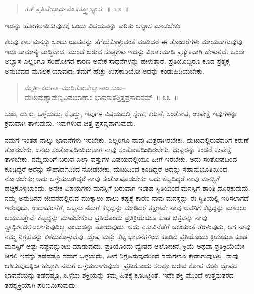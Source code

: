 \vspace{-0.3cm}

\begin{verse}
ತತ್​ ಪ್ರತಿಷೇಧಾರ್ಥಮೇಕತತ್ತ್ವಾಭ್ಯಾಸಃ~॥ ೩೨~॥
\end{verse}

\vspace{-0.3cm}

ಇದನ್ನು ಹೋಗಲಾಡಿಸುವುದಕ್ಕೆ ಒಂದು ವಿಷಯವನ್ನು ಕುರಿತು ಅಭ್ಯಾಸ ಮಾಡಬೇಕು. 

ಕೆಲವು ಕಾಲ ಮನಸ್ಸು ಒಂದು ರೂಪವನ್ನು ತೆಗೆದುಕೊಳ್ಳುವಂತೆ ಮಾಡಿದರೆ ಈ ತೊಂದರೆಗಳು ಮಾಯವಾಗುವುವು. ಇದು ಸಾಮಾನ್ಯ ಬುದ್ಧಿವಾದ. ಮುಂದೆ ಬರುವ ಸೂತ್ರಗಳು ಇದನ್ನು ವಿಶಾಲಮಾಡಿ ಪ್ರತ್ಯೇಕವಾಗಿ ಹೇಳುತ್ತವೆ. ಒಂದೇ ಅಭ್ಯಾಸ ಎಲ್ಲರಿಗೂ ಸರಿಹೋಗದ ಕಾರಣ ಅನೇಕ ಸಾಧನೆಗಳನ್ನು ಹೇಳುತ್ತಾರೆ. ಪ್ರತಿಯೊಬ್ಬರೂ ಕೂಡ ಪ್ರತ್ಯಕ್ಷ ಅನುಭವದ ಮೂಲಕ ಯಾವುದು ತಮಗೆ ಹೆಚ್ಚು ಉಪಕಾರಿಯೋ ಅದನ್ನು ಕಂಡುಹಿಡಿಯಬೇಕು. 

\vspace{-0.3cm}

\begin{verse}
ಮೈತ್ರೀ–ಕರುಣಾ–ಮುದಿತೋಪೇಕ್ಷಾಣಾಂ ಸುಖ–\\ದುಃಖಪುಣ್ಯಾಪುಣ್ಯವಿಷಯಾಣಾಂ ಭಾವನಾತಶ್ತಿತ್ತಪ್ರಸಾದನಮ್​~॥ ೩೩~॥
\end{verse}

\vspace{-0.3cm}

ಸುಖ, ದುಃಖ, ಒಳ್ಳೆಯದು, ಕೆಟ್ಟದ್ದು, ಇವುಗಳ ವಿಷಯದಲ್ಲಿ ಸ್ನೇಹ, ಕರುಣೆ, ಸಂತೋಷ, ಉಪೇಕ್ಷೆ ಇವುಗಳನ್ನು ಕ್ರಮವಾಗಿ ತಾಳುವುದು. ಇವುಗಳಿಂದ ಚಿತ್ತ ಪ್ರಸನ್ನ\break ವಾಗುವುದು. 

ನಮಗೆ ಇಂತಹ ನಾಲ್ಕು ಭಾವನೆಗಳು ಇರಬೇಕು. ಎಲ್ಲರಿಗೂ ನಾವು ಮಿತ್ರರಾಗಿರಬೇಕು. ದುಃಖದಲ್ಲಿರುವವರಿಗೆ ಕರುಣೆ ತೋರಬೇಕು. ಜನರು ಸಂತೋಷದಿಂದಿರುವಾಗ ನಾವು ಸಂತೋಷದಿಂದಿರಬೇಕು. ದುಷ್ಟರನ್ನು ಕಂಡರೆ ಉಪೇಕ್ಷೆ ತಾಳಬೇಕು. ನಮ್ಮೆದುರಿಗೆ ಬರುವ ಎಲ್ಲಾ ವಸ್ತುಗಳ ವಿಷಯದಲ್ಲಿಯೂ ಹೀಗೆ ಇರಬೇಕು. ಅದು ಸಂತೋಷದಿಂದ ಕೂಡಿದ್ದರೆ ಅದನ್ನು ಸೌಹಾರ್ದದಿಂದ ನೋಡಬೇಕು; ದುಃಖದಿಂದ ಕೂಡಿದ್ದರೆ ಅದನ್ನು ಸಹಾನುಭೂತಿಯಿಂದ ನೋಡಬೇಕು; ಅದು ಒಳ್ಳೆಯದಾಗಿದ್ದರೆ ನಾವು ಸಂತೋಷಪಡಬೇಕು; ಅದು ಕೆಟ್ಟದಿದ್ದರೆ ನಾವು ಮನಸ್ಸಿಗೆ ಹಚ್ಚಿಕೊಳ್ಳಬಾರದು. ಅನೇಕ ವಿಷಯಗಳು ಮನಸ್ಸಿಗೆ ಬರುವಾಗ ಇಂತಹ ಸ್ಥಿತಿಯಿಂದ ಮನಸ್ಸಿಗೆ ಶಾಂತಿ ದೊರಕುವುದು. ನಮ್ಮ ಅನುದಿನದ ಜೀವನದಲ್ಲಿರುವ ಮುಕ್ಕಾಲು ಪಾಲು ಕಷ್ಟಕ್ಕೆ ಕಾರಣ ನಾವು ಮನಸ್ಸನ್ನು ಈ ಸ್ಥಿತಿಯಲ್ಲಿ ಇರಿಸಲಾಗದೆ ಇರುವುದು. ಉದಾಹರಣೆಗೆ, ಒಬ್ಬನು ನಮಗೆ ಕೆಟ್ಟದ್ದನ್ನು ಮಾಡಿದರೆ ತಕ್ಷಣವೇ ನಾವು ಅವನಿಗೆ ಕೆಟ್ಟದ್ದನ್ನು ಮಾಡಲು ಬಯಸುತ್ತೇವೆ. ಕೆಟ್ಟದ್ದನ್ನು ಮಾಡಬೇಕೆಂಬ ಪ್ರತಿಯೊಂದು ಪ್ರತಿಕ್ರಿಯೆಯೂ ಕೂಡ ಚಿತ್ತವನ್ನು ನಾವು ಸ್ವಾಧೀನದಲ್ಲಿಡಲಾಗುವುದಿಲ್ಲ ಎಂಬುದನ್ನು ತೋರುವುದು. ಅದು ವಸ್ತುವಿನೆಡೆಗೆ ಅಲೆಯಂತೆ ತೆರಳುವುದು, ಆಗ ನಾವು ನಮ್ಮ ನಿಗ್ರಹವನ್ನು ಕಳೆದುಕೊಳ್ಳುವೆವು. ದ್ವೇಷ ಮತ್ತು ಕೆಟ್ಟ ಭಾವನೆಗಳಿಂದ ಕೂಡಿದ ಪ್ರತಿಯೊಂದು ಕ್ರಿಯೆಯೂ ಕೂಡ ಮನಸ್ಸಿಗೆ ಅಷ್ಟು ನಷ್ಟವನ್ನುಂಟು ಮಾಡುವುದು. ಪ್ರತಿಯೊಂದು ದ್ವೇಷದ ಆಲೋಚನೆ, ಕ್ರಿಯೆ ಅಥವಾ ಪ್ರತಿಕ್ರಿಯೆಯೇ ಆಗಲಿ ಇವನ್ನು ತಡೆದಷ್ಟೂ ನಮಗೆ ಒಳ್ಳೆಯದು. ಹೀಗೆ ನಿಗ್ರಹಿಸುವುದರಿಂದ ನಮಗೇನೂ ಕೇಡಾಗುವುದಿಲ್ಲ. ನಾವು ಆಶಿಸುವುದಕ್ಕಿಂತ ಹೆಚ್ಚಾಗಿ ನಮಗೆ ಒಳ್ಳೆಯದಾಗುವುದು. ಪ್ರತಿಯೊಂದು ಸಲವೂ ಬರುವ ಕೋಪ ಮತ್ತು ದ್ವೇಷದ ಭಾವನೆಯನ್ನು ತಡೆದಷ್ಟೂ, ಒಳ್ಳೆಯ ಶಕ್ತಿಯನ್ನು ತಮ್ಮ ಹಿತಕ್ಕೆ ಕೂಡಿಟ್ಟಂತೆ. ಇದೇ ಶಕ್ತಿ ಮುಂದೆ ಉತ್ತಮತರದ ತಪಶ್ಯಕ್ತಿಯಾಗಿ ಪರಿಣಮಿಸುವುದು. 

